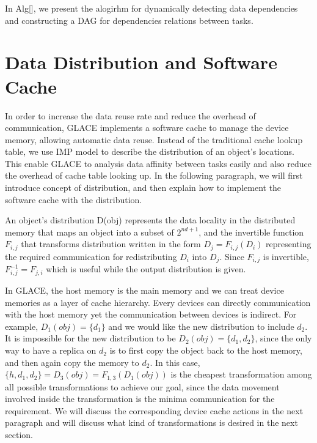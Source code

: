 \documentclass[preprint,11pt]{elsarticle}
\begin{document}
  In Alg[], we present the alogirhm for dynamically detecting data dependencies and constructing a DAG for dependencies relations between tasks.\\


 


\section{Data Distribution and Software Cache}
  In order to increase the data reuse rate and reduce the overhead of communication, GLACE
  implements a software cache to manage the device memory, allowing automatic data reuse. 
  Instead of the traditional cache lookup table, we use IMP model \cite{} to describe the distribution 
  of an object's locations. This enable GLACE to analysis data affinity between tasks easily and 
  also reduce the overhead of cache table looking up. In the following paragraph, we will first 
  introduce concept of distribution, and then explain how to implement the software cache with
  the distribution.    
  
  An object's distribution D(obj) represents the data locality in the distributed memory that maps 
  an object into a subset of $2^{nd+1}$, and the invertible function $F_{i,j}$ that transforms 
  distribution written in the form $D_j = F_{i, j}(D_i)$ representing 
  the required communication for redistributing $D_i$ into $D_j$. Since $F_{i, j}$ is invertible,
  $F_{i, j}^{-1} = F_{j, i}$ which is useful while the output distribution is given.  
  
  In GLACE, the host memory is the main memory and we can treat device memories as a 
  layer of cache hierarchy. Every devices can directly communication with the host memory 
  yet the communication between devices is indirect. For example, $D_1(obj) = \{d_1\}$ and 
  we would like the new distribution to include $d_2$. It is impossible for the new distribution
  to be $D_2(obj) = \{d_1, d_2\}$, since the only way to have a replica on $d_2$ is to 
  first copy the object back to the host memory, and then again copy the memory to $d_2$.
  In this case, $\{h, d_1, d_2\} = D_3(obj) = F_{1, 3}(D_1(obj))$ is the cheapest transformation
  among all possible transformations to achieve our goal, since the data movement involved 
  inside the transformation is the minima communication for the requirement.
  We will discuss the corresponding device cache actions in the next paragraph and will discuss 
  what kind of transformations is desired in the next section. 
  
\end{document}
